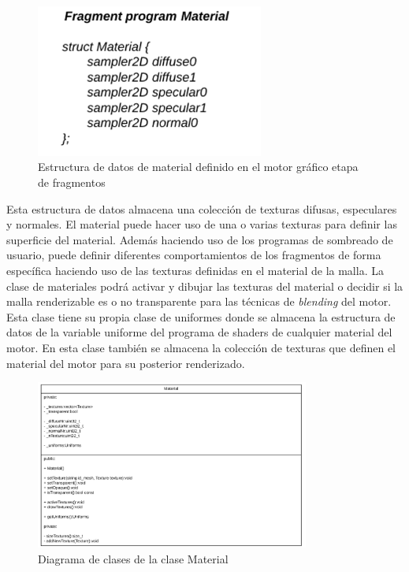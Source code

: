 \documentclass[a4paper]{book}
\begin{document}
\begin{figure}[H]
    \centering
    \includegraphics[width=7.5cm, keepaspectratio]{img/material.png}
    \caption{Estructura de datos de material definido en el motor gráfico etapa de fragmentos}
    \label{Material}
\end{figure}

Esta estructura de datos almacena una colección de texturas difusas, especulares y normales. El material puede hacer uso de una o
varias texturas para definir las superficie del material. Además haciendo uso de los programas de sombreado de usuario, puede definir
diferentes comportamientos de los fragmentos de forma específica haciendo uso de las texturas definidas en el material de la malla. La clase
de materiales podrá activar y dibujar las texturas del material o decidir si la malla renderizable es o no transparente para
las técnicas de \textit{blending} del motor. Esta clase tiene su propia clase de uniformes donde se almacena la estructura de datos de la variable
uniforme del programa de shaders de cualquier material del motor. En esta clase también se almacena la colección de texturas que definen
el material del motor para su posterior renderizado.

\begin{figure}[H]
    \centering
    \includegraphics[width=9cm, keepaspectratio]{img/Material.png}
    \caption{Diagrama de clases de la clase Material}
    \label{material_class}
\end{figure}
\end{document}
